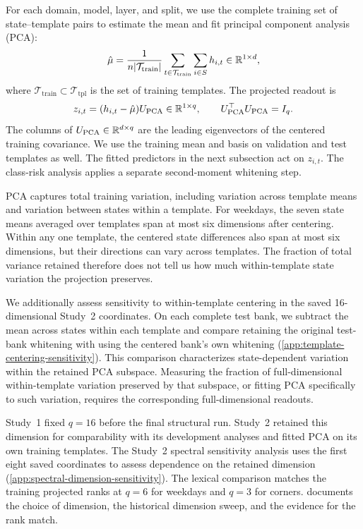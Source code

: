 For each domain, model, layer, and split, we use the complete training set of state--template pairs to estimate the mean and fit principal component analysis (PCA):
\[
 \hat\mu=\frac{1}{n|\mathcal T_{\mathrm{train}}|}
 \sum_{t\in\mathcal T_{\mathrm{train}}}\sum_{i\in S}h_{i,t}
 \in\mathbb{R}^{1\times d},
\]
where $\mathcal T_{\mathrm{train}}\subset\mathcal T_{\mathrm{tpl}}$ is the set of training templates. The projected readout is
\begin{equation}
 z_{i,t}=(h_{i,t}-\hat\mu)U_{\mathrm{PCA}}\in\mathbb{R}^{1\times q},
 \qquad U_{\mathrm{PCA}}^\top U_{\mathrm{PCA}}=I_q.
 \label{eq:projection}
\end{equation}
The columns of $U_{\mathrm{PCA}}\in\mathbb{R}^{d\times q}$ are the leading eigenvectors of the centered training covariance.
We use the training mean and basis on validation and test templates as well.
The fitted predictors in the next subsection act on $z_{i,t}$.
The class-risk analysis applies a separate second-moment whitening step.

PCA captures total training variation, including variation across template means and variation between states within a template.
For weekdays, the seven state means averaged over templates span at most six dimensions after centering.
Within any one template, the centered state differences also span at most six dimensions, but their directions can vary across templates.
The fraction of total variance retained therefore does not tell us how much within-template state variation the projection preserves.

We additionally assess sensitivity to within-template centering
in the saved 16-dimensional Study~2 coordinates.
On each complete test bank, we subtract the mean across states
within each template and compare retaining the original
test-bank whitening with using the centered bank's own whitening
(\cref{app:template-centering-sensitivity}).
This comparison characterizes state-dependent variation
within the retained PCA subspace.
Measuring the fraction of full-dimensional within-template
variation preserved by that subspace, or fitting PCA specifically
to such variation, requires the corresponding full-dimensional
readouts.

Study~1 fixed $q=16$ before the final structural run.
Study~2 retained this dimension for comparability with its development analyses and fitted PCA on its own training templates.
The Study~2 spectral sensitivity analysis uses the first eight saved coordinates to assess dependence on the retained dimension (\cref{app:spectral-dimension-sensitivity}).
The lexical comparison matches the training projected ranks at $q=6$ for weekdays and $q=3$ for corners.
 documents the choice of dimension, the historical dimension sweep, and the evidence for the rank match.

